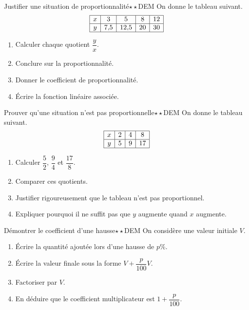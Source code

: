 \documentclass[11pt,a4paper]{article}
\newcounter{exo}
\begin{document}
\begin{exobox}{Justifier une situation de proportionnalité}{$\star\star$}{DEM}
On donne le tableau suivant.
\[
\begin{array}{|c|c|c|c|c|}
\hline
x & 3 & 5 & 8 & 12 \\
\hline
y & 7{,}5 & 12{,}5 & 20 & 30 \\
\hline
\end{array}
\]
\begin{enumerate}
\item Calculer chaque quotient $\dfrac{y}{x}$.
\item Conclure sur la proportionnalité.
\item Donner le coefficient de proportionnalité.
\item Écrire la fonction linéaire associée.
\end{enumerate}
\end{exobox}

\begin{exobox}{Prouver qu'une situation n'est pas proportionnelle}{$\star\star$}{DEM}
On donne le tableau suivant.
\[
\begin{array}{|c|c|c|c|}
\hline
x & 2 & 4 & 8 \\
\hline
y & 5 & 9 & 17 \\
\hline
\end{array}
\]
\begin{enumerate}
\item Calculer $\dfrac{5}{2}$, $\dfrac{9}{4}$ et $\dfrac{17}{8}$.
\item Comparer ces quotients.
\item Justifier rigoureusement que le tableau n'est pas proportionnel.
\item Expliquer pourquoi il ne suffit pas que $y$ augmente quand $x$ augmente.
\end{enumerate}
\end{exobox}

\begin{exobox}{Démontrer le coefficient d'une hausse}{$\star\star$}{DEM}
On considère une valeur initiale $V$.
\begin{enumerate}
\item Écrire la quantité ajoutée lors d'une hausse de $p\%$.
\item Écrire la valeur finale sous la forme $V+\dfrac{p}{100}V$.
\item Factoriser par $V$.
\item En déduire que le coefficient multiplicateur est $1+\dfrac{p}{100}$.
\end{enumerate}
\end{exobox}
\end{document}
